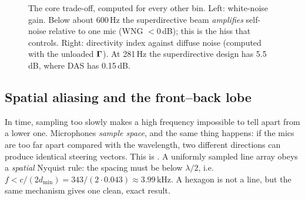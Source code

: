 \documentclass[11pt]{article}
\begin{document}
\begin{figure}[ht]
\caption{The core trade-off, computed for every other bin. Left: white-noise gain. Below about
600\,Hz the superdirective beam \emph{amplifies} self-noise relative to one mic (WNG $<0$\,dB);
this is the hiss that  controls. Right: directivity index against diffuse
noise (computed with the unloaded $\bm{\Gamma}$). At 281\,Hz the superdirective design has 5.5\,dB, where
DAS has 0.15\,dB.}
\label{fig:wngdi}
\end{figure}

\subsection{Spatial aliasing and the front--back lobe}\label{sec:aliasing}

In time, sampling too slowly makes a high frequency impossible to tell apart from a lower one.
Microphones \emph{sample space}, and the same thing happens: if the mics are too far apart
compared with the wavelength, two different directions can produce identical steering vectors.
This is .
A uniformly sampled line array obeys a \emph{spatial} Nyquist rule: the spacing must be below
$\lambda/2$, i.e.\ $f<c/(2d_{\min})=343/(2\cdot0.043)\approx3.99$\,kHz. A hexagon is not a
line, but the same mechanism gives one clean, exact result.
\end{document}
